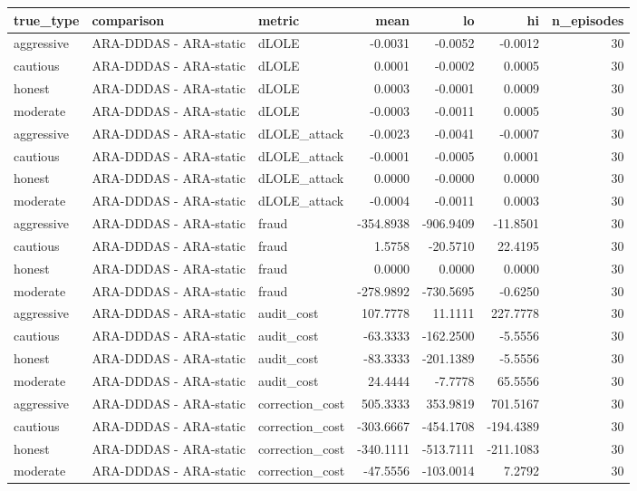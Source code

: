 \begin{tabular}{lllrrrr}
\toprule
true_type & comparison & metric & mean & lo & hi & n_episodes \\
\midrule
aggressive & ARA-DDDAS - ARA-static & dLOLE & -0.0031 & -0.0052 & -0.0012 & 30 \\
cautious & ARA-DDDAS - ARA-static & dLOLE & 0.0001 & -0.0002 & 0.0005 & 30 \\
honest & ARA-DDDAS - ARA-static & dLOLE & 0.0003 & -0.0001 & 0.0009 & 30 \\
moderate & ARA-DDDAS - ARA-static & dLOLE & -0.0003 & -0.0011 & 0.0005 & 30 \\
aggressive & ARA-DDDAS - ARA-static & dLOLE_attack & -0.0023 & -0.0041 & -0.0007 & 30 \\
cautious & ARA-DDDAS - ARA-static & dLOLE_attack & -0.0001 & -0.0005 & 0.0001 & 30 \\
honest & ARA-DDDAS - ARA-static & dLOLE_attack & 0.0000 & -0.0000 & 0.0000 & 30 \\
moderate & ARA-DDDAS - ARA-static & dLOLE_attack & -0.0004 & -0.0011 & 0.0003 & 30 \\
aggressive & ARA-DDDAS - ARA-static & fraud & -354.8938 & -906.9409 & -11.8501 & 30 \\
cautious & ARA-DDDAS - ARA-static & fraud & 1.5758 & -20.5710 & 22.4195 & 30 \\
honest & ARA-DDDAS - ARA-static & fraud & 0.0000 & 0.0000 & 0.0000 & 30 \\
moderate & ARA-DDDAS - ARA-static & fraud & -278.9892 & -730.5695 & -0.6250 & 30 \\
aggressive & ARA-DDDAS - ARA-static & audit_cost & 107.7778 & 11.1111 & 227.7778 & 30 \\
cautious & ARA-DDDAS - ARA-static & audit_cost & -63.3333 & -162.2500 & -5.5556 & 30 \\
honest & ARA-DDDAS - ARA-static & audit_cost & -83.3333 & -201.1389 & -5.5556 & 30 \\
moderate & ARA-DDDAS - ARA-static & audit_cost & 24.4444 & -7.7778 & 65.5556 & 30 \\
aggressive & ARA-DDDAS - ARA-static & correction_cost & 505.3333 & 353.9819 & 701.5167 & 30 \\
cautious & ARA-DDDAS - ARA-static & correction_cost & -303.6667 & -454.1708 & -194.4389 & 30 \\
honest & ARA-DDDAS - ARA-static & correction_cost & -340.1111 & -513.7111 & -211.1083 & 30 \\
moderate & ARA-DDDAS - ARA-static & correction_cost & -47.5556 & -103.0014 & 7.2792 & 30 \\

\end{tabular}
